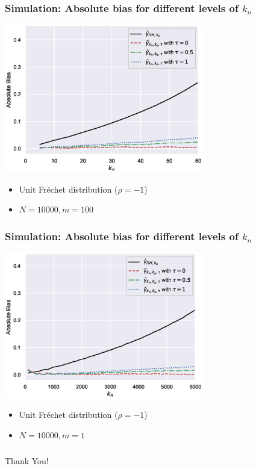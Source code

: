 \documentclass{beamer}
\begin{document}
\begin{frame}
    \frametitle{Simulation: Absolute bias for different levels of $k_n$}
\begin{center}
    \includegraphics[width=0.65\textwidth]{program/simu1/figs/Frechet_m100_0.eps}
\end{center}
\vspace{-2ex}
\begin{itemize}
    \item Unit Fr\'echet distribution ($\rho = -1$)
    \item  $N = 10000, m=100$
\end{itemize}
\end{frame}


\begin{frame}
    \frametitle{Simulation: Absolute bias for different levels of $k_n$}
\begin{center}
    \includegraphics[width=0.65\textwidth]{program/simu1/figs/Frechet_m1_0.eps}
\end{center}
\vspace{-2ex}
\begin{itemize}
    \item Unit Fr\'echet distribution ($\rho = -1$)
    \item  $N = 10000, m=1$
\end{itemize}
\end{frame}

\begin{frame}
    \frametitle{}

    \begin{center}
        {\LARGE  Thank You!}
    \end{center}

\end{frame}
\end{document}
